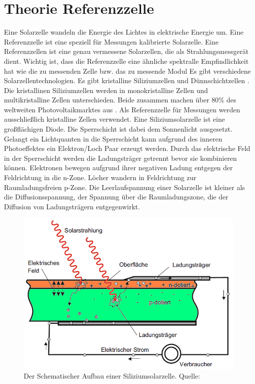 \documentclass[a4paper,bibtotoc,oneside]{scrbook}
\begin{document}
\section{Theorie Referenzzelle}\thispagestyle{empty}
Eine Solarzelle wandeln die Energie des Lichtes in elektrische Energie um. Eine Referenzzelle ist eine speziell für Messungen kalibrierte Solarzelle. Eine Referenzzellen ist eine genau vermessene Solarzellen, die als Strahlungsmessgerät dient. Wichtig ist, dass die Referenzzelle eine ähnliche spektralle Empfindlichkeit hat wie die zu messenden Zelle bzw. das zu messende Modul
Es gibt verschiedene Solarzellentechnologien. Es gibt kristalline Siliziumzellen und Dünnschichtzellen . Die kristallinen Siliziumzellen werden in monokristalline Zellen und multikristalline Zellen unterschieden. Beide zusammen machen über 80\% des weltweiten Photovoltaikmarktes aus \cite{iea00}. Als Referenzzelle für Messungen werden ausschließlich kristalline Zellen verwendet. 
Eine Siliziumsolarzelle ist eine großflächigen Diode. Die Sperrschicht ist dabei dem Sonnenlicht ausgesetzt. Gelangt ein Lichtquanten in die Sperrschicht kann aufgrund des inneren Photoeffektes ein Elektron/Loch Paar erzeugt werden. Durch das elektrische Feld in der Sperrschicht werden die Ladungsträger getrennt bevor sie kombinieren können. Elektronen bewegen aufgrund ihrer negativen Ladung entgegen der Feldrichtung in die n-Zone. Löcher wandern in Feldrichtung zur Raumladungsfreien p-Zone. Die Leerlaufspannung einer Solarzelle ist kleiner als die Diffusionsspannung, der Spannung über die Raumladungszone, die der Diffusion von Ladungsträgern entgegenwirkt.
\begin{figure}[htbp]
\centering
\includegraphics[width=125mm]{img/zelle2.png}
\caption{Der Schematischer Aufbau einer Siliziumsolarzelle. Quelle: \cite{pv}}\label{cell}
\end{figure}
\end{document}
